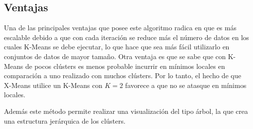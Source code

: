 \subsection{Ventajas}

Una de las principales ventajas que posee este algoritmo radica en que es más escalable debido a que con cada iteración se reduce más el número de datos en los cuales K-Means se debe ejecutar, lo que hace que sea más fácil utilizarlo en conjuntos de datos de mayor tamaño. Otra ventaja es que se sabe que con K-Means de pocos clústers es menos probable incurrir en mínimos locales en comparación a uno realizado con muchos clústers. Por lo tanto, el hecho de que X-Means utilice un K-Means con $K=2$ favorece a que no se atasque en mínimos locales.

Además este método permite realizar una visualización del tipo árbol, la que crea una estructura jerárquica de los clústers.